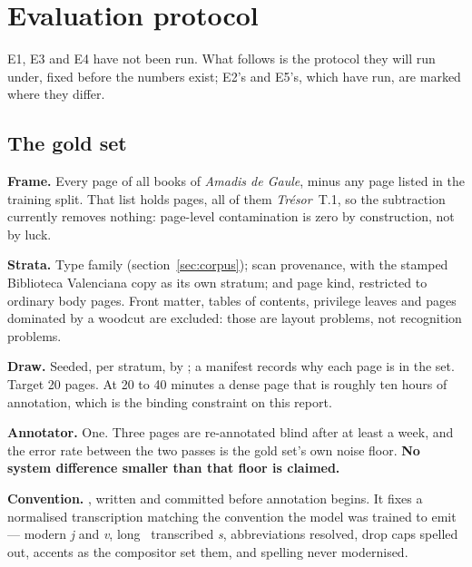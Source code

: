 \section{Evaluation protocol}
\label{sec:protocol}

E1, E3 and E4 have not been run. What follows is the protocol they will run
under, fixed before the numbers exist; E2's and E5's, which have run, are
marked where they differ.

\subsection{The gold set}

\textbf{Frame.} Every page of all \ocrBooks{} books of \emph{Amadis de Gaule},
minus any page listed in the training split. That list holds \trainPages{}
pages, all of them \emph{Trésor}~T.1, so the subtraction currently removes
nothing: page-level contamination is zero by construction, not by luck.

\textbf{Strata.} Type family (section~\ref{sec:corpus}); scan provenance,
with the stamped Biblioteca Valenciana copy as its own stratum; and page kind,
restricted to ordinary body pages. Front matter, tables of contents, privilege
leaves and pages dominated by a woodcut are excluded: those are layout
problems, not recognition problems.

\textbf{Draw.} Seeded, per stratum, by ; a
manifest records why each page is in the set. Target 20 pages. At 20 to 40
minutes a dense page that is roughly ten hours of annotation, which is the
binding constraint on this report.

\textbf{Annotator.} One. Three pages are re-annotated blind after at least a
week, and the error rate between the two passes is the gold set's own noise
floor. \textbf{No system difference smaller than that floor is claimed.}

\textbf{Convention.} , written and committed
before annotation begins. It fixes a normalised transcription matching the
convention the model was trained to emit --- modern \emph{j} and \emph{v},
long~ transcribed \emph{s}, abbreviations resolved, drop caps spelled
out, accents as the compositor set them, and spelling never modernised.

